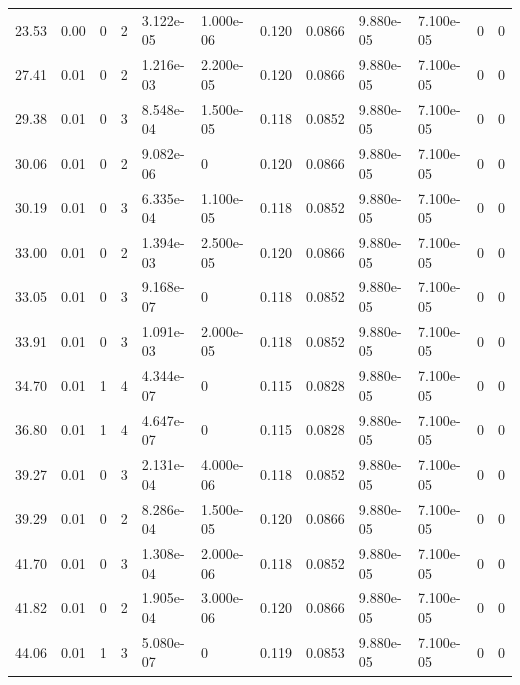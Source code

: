 \documentclass[preview]{standalone}
\begin{document}
{{\begin{tabular}{L{1.2cm}C{1.2cm} C{0.3cm}C{0.5cm} C{1.4cm}C{1.4cm} C{1.4cm}C{1.4cm} C{1.6cm}C{1.6cm} C{1.6cm}C{1.6cm}}
  23.53  &  0.00  & 0     &  2 &  3.122e-05  & 1.000e-06  &  0.120&   0.0866& 9.880e-05 & 7.100e-05   &  0 & 0  \\ 
  27.41  &  0.01  & 0     &  2 &  1.216e-03  & 2.200e-05  &  0.120&   0.0866& 9.880e-05 & 7.100e-05   &  0 & 0  \\ 
  29.38  &  0.01  & 0     &  3 &  8.548e-04  & 1.500e-05  &  0.118&   0.0852& 9.880e-05 & 7.100e-05   &  0 & 0  \\ 
  30.06  &  0.01  & 0     &  2 &  9.082e-06  & 0  &  0.120&   0.0866& 9.880e-05 & 7.100e-05   &  0 & 0  \\ 
  30.19  &  0.01  & 0     &  3 &  6.335e-04  & 1.100e-05  &  0.118&   0.0852& 9.880e-05 & 7.100e-05   &  0 & 0  \\ 
  33.00  &  0.01  & 0     &  2 &  1.394e-03  & 2.500e-05  &  0.120&   0.0866& 9.880e-05 & 7.100e-05   &  0 & 0  \\ 
  33.05  &  0.01  & 0     &  3 &  9.168e-07  & 0  &  0.118&   0.0852& 9.880e-05 & 7.100e-05   &  0 & 0  \\ 
  33.91  &  0.01  & 0     &  3 &  1.091e-03  & 2.000e-05  &  0.118&   0.0852& 9.880e-05 & 7.100e-05   &  0 & 0  \\ 
  34.70  &  0.01  & 1     &  4 &  4.344e-07  & 0  &  0.115&   0.0828& 9.880e-05 & 7.100e-05   &  0 & 0  \\ 
  36.80  &  0.01  & 1     &  4 &  4.647e-07  & 0  &  0.115&   0.0828& 9.880e-05 & 7.100e-05   &  0 & 0  \\ 
  39.27  &  0.01  & 0     &  3 &  2.131e-04  & 4.000e-06  &  0.118&   0.0852& 9.880e-05 & 7.100e-05   &  0 & 0  \\ 
  39.29  &  0.01  & 0     &  2 &  8.286e-04  & 1.500e-05  &  0.120&   0.0866& 9.880e-05 & 7.100e-05   &  0 & 0  \\ 
  41.70  &  0.01  & 0     &  3 &  1.308e-04  & 2.000e-06  &  0.118&   0.0852& 9.880e-05 & 7.100e-05   &  0 & 0  \\ 
  41.82  &  0.01  & 0     &  2 &  1.905e-04  & 3.000e-06  &  0.120&   0.0866& 9.880e-05 & 7.100e-05   &  0 & 0  \\ 
  44.06  &  0.01  & 1     &  3 &  5.080e-07  & 0  &  0.119&   0.0853& 9.880e-05 & 7.100e-05   &  0 & 0  \\ 
\hline 
\end{tabular} 

}}
\end{document}
